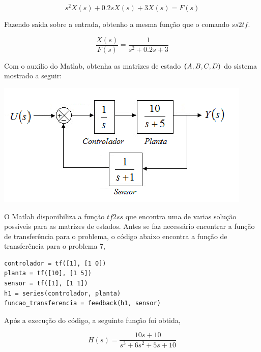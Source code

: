 \documentclass[paper=a4, fontsize=11pt]{article}
\begin{document}
\begin{list}{\textbf{Questão .}}{
\setlength{\labelwidth}{-2mm} \setlength{\parsep}{0mm}
\setlength{\topsep}{0mm} \setlength{\leftmargin}{0mm}}
        $$
        s^2 X(s) + 0.2 s X(s) + 3 X(s) = F(s)
        $$
       
\newpage

        Fazendo saída sobre a entrada, obtenho a mesma
        função que o comando $ss2tf$.
        
        \begin{equation}
        \frac{X(s)}{F(s)} = \frac{1}{s^2 + 0.2 s + 3}
        \end{equation}




\newpage
\item
    Com o auxilio do Matlab, obtenha as matrizes de estado $\textbf(A, B, C, D)$ do 
    sistema mostrado a seguir:
            \begin{center}
            \includegraphics[scale=0.6]{fig7.png}
            \end{center}

            O Matlab disponibiliza a função $tf2ss$ que encontra uma de varias 
            solução possíveis para as matrizes de estados. Antes se faz
            necessário encontrar a função de transferência para o problema, 
            o código abaixo encontra a função de transferência para o problema 7,

            \begin{lstlisting}
controlador = tf([1], [1 0])
planta = tf([10], [1 5])
sensor = tf([1], [1 1])
h1 = series(controlador, planta)
funcao_transferencia = feedback(h1, sensor)
                \end{lstlisting}

            Após a execução do código, a seguinte função foi obtida,

            $$
            H(s) = \frac{10 s + 10}{s^3 + 6 s^2 + 5 s + 10}
            $$


\end{list}
\end{document}
